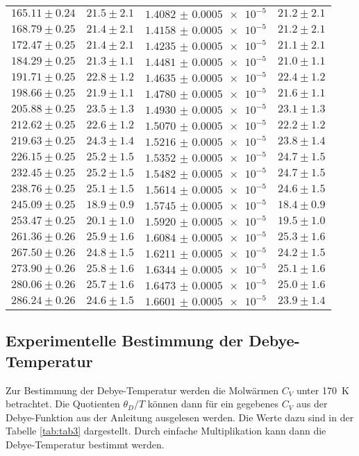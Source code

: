 \begin{table}
\begin{tabular}{c c c c}
		$165.11\pm0.24$ & $21.5\pm2.1$ & $\num{1.4082(5)e-5}$ & $21.2\pm2.1$ \\
		$168.79\pm0.25$ & $21.4\pm2.1$ & $\num{1.4158(5)e-5}$ & $21.2\pm2.1$ \\
		$172.47\pm0.25$ & $21.4\pm2.1$ & $\num{1.4235(5)e-5}$ & $21.1\pm2.1$ \\
		$184.29\pm0.25$ & $21.3\pm1.1$ & $\num{1.4481(5)e-5}$ & $21.0\pm1.1$ \\
		$191.71\pm0.25$ & $22.8\pm1.2$ & $\num{1.4635(5)e-5}$ & $22.4\pm1.2$ \\
		$198.66\pm0.25$ & $21.9\pm1.1$ & $\num{1.4780(5)e-5}$ & $21.6\pm1.1$ \\
		$205.88\pm0.25$ & $23.5\pm1.3$ & $\num{1.4930(5)e-5}$ & $23.1\pm1.3$ \\
		$212.62\pm0.25$ & $22.6\pm1.2$ & $\num{1.5070(5)e-5}$ & $22.2\pm1.2$ \\
		$219.63\pm0.25$ & $24.3\pm1.4$ & $\num{1.5216(5)e-5}$ & $23.8\pm1.4$ \\
		$226.15\pm0.25$ & $25.2\pm1.5$ & $\num{1.5352(5)e-5}$ & $24.7\pm1.5$ \\
		$232.45\pm0.25$ & $25.2\pm1.5$ & $\num{1.5482(5)e-5}$ & $24.7\pm1.5$ \\
		$238.76\pm0.25$ & $25.1\pm1.5$ & $\num{1.5614(5)e-5}$ & $24.6\pm1.5$ \\
		$245.09\pm0.25$ & $18.9\pm0.9$ & $\num{1.5745(5)e-5}$ & $18.4\pm0.9$ \\
		$253.47\pm0.25$ & $20.1\pm1.0$ & $\num{1.5920(5)e-5}$ & $19.5\pm1.0$ \\
		$261.36\pm0.26$ & $25.9\pm1.6$ & $\num{1.6084(5)e-5}$ & $25.3\pm1.6$ \\
		$267.50\pm0.26$ & $24.8\pm1.5$ & $\num{1.6211(5)e-5}$ & $24.2\pm1.5$ \\
		$273.90\pm0.26$ & $25.8\pm1.6$ & $\num{1.6344(5)e-5}$ & $25.1\pm1.6$ \\
		$280.06\pm0.26$ & $25.7\pm1.6$ & $\num{1.6473(5)e-5}$ & $25.0\pm1.6$ \\
		$286.24\pm0.26$ & $24.6\pm1.5$ & $\num{1.6601(5)e-5}$ & $23.9\pm1.4$ \\
    \bottomrule
  \end{tabular}
\end{table}

\subsection{Experimentelle Bestimmung der Debye-Temperatur}

Zur Bestimmung der Debye-Temperatur werden die Molwärmen $C_V$ unter \SI{170}{\kelvin} betrachtet.
Die Quotienten $\theta_D / T$ können dann für ein gegebenes $C_V$ aus der Debye-Funktion aus der Anleitung \cite{V47} ausgelesen werden.
Die Werte dazu sind in der Tabelle \ref{tab:tab3} dargestellt.
Durch einfache Multiplikation kann dann die Debye-Temperatur bestimmt werden.

